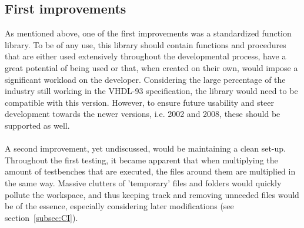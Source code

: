 \documentclass[11pt,british]{article}
\begin{document}
\subsection{First improvements}
As mentioned above, one of the first improvements was a standardized function library. To be of any use, this library should contain functions and procedures that are either used extensively throughout the developmental process, have a great potential of being used or that, when created on their own, would impose a significant workload on the developer. Considering the large percentage of the industry still working in the VHDL-93 specification, the library would need to be compatible with this version. However, to ensure future usability and steer development towards the newer versions, i.e. 2002 and 2008, these should be supported as well.\\
\\
A second improvement, yet undiscussed, would be maintaining a clean set-up. Throughout the first testing, it became apparent that when multiplying the amount of testbenches that are executed, the files around them are multiplied in the same way. Massive clutters of 'temporary' files and folders would quickly pollute the workspace, and thus keeping track and removing unneeded files would be of the essence, especially considering later modifications (see section~\ref{subsec:CI}).
\end{document}
